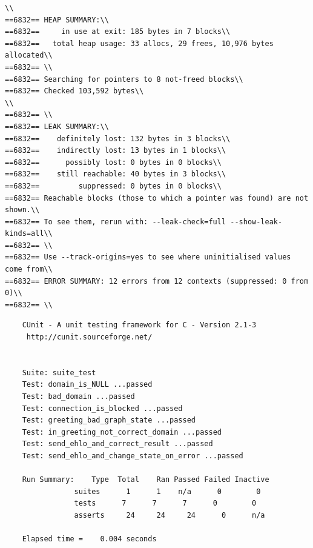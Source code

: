 \documentclass[a4paper,12pt]{report}
\begin{document}
\begin{verbatim}
\\
==6832== HEAP SUMMARY:\\
==6832==     in use at exit: 185 bytes in 7 blocks\\
==6832==   total heap usage: 33 allocs, 29 frees, 10,976 bytes allocated\\
==6832== \\
==6832== Searching for pointers to 8 not-freed blocks\\
==6832== Checked 103,592 bytes\\
\\
==6832== \\
==6832== LEAK SUMMARY:\\
==6832==    definitely lost: 132 bytes in 3 blocks\\
==6832==    indirectly lost: 13 bytes in 1 blocks\\
==6832==      possibly lost: 0 bytes in 0 blocks\\
==6832==    still reachable: 40 bytes in 3 blocks\\
==6832==         suppressed: 0 bytes in 0 blocks\\
==6832== Reachable blocks (those to which a pointer was found) are not shown.\\
==6832== To see them, rerun with: --leak-check=full --show-leak-kinds=all\\
==6832== \\
==6832== Use --track-origins=yes to see where uninitialised values come from\\
==6832== ERROR SUMMARY: 12 errors from 12 contexts (suppressed: 0 from 0)\\
==6832== \\
\end{verbatim}

\begin{verbatim}
    CUnit - A unit testing framework for C - Version 2.1-3
     http://cunit.sourceforge.net/


    Suite: suite_test
    Test: domain_is_NULL ...passed
    Test: bad_domain ...passed
    Test: connection_is_blocked ...passed
    Test: greeting_bad_graph_state ...passed
    Test: in_greeting_not_correct_domain ...passed
    Test: send_ehlo_and_correct_result ...passed
    Test: send_ehlo_and_change_state_on_error ...passed

    Run Summary:    Type  Total    Ran Passed Failed Inactive
                suites      1      1    n/a      0        0
                tests      7      7      7      0        0
                asserts     24     24     24      0      n/a

    Elapsed time =    0.004 seconds
\end{verbatim}
\end{document}
